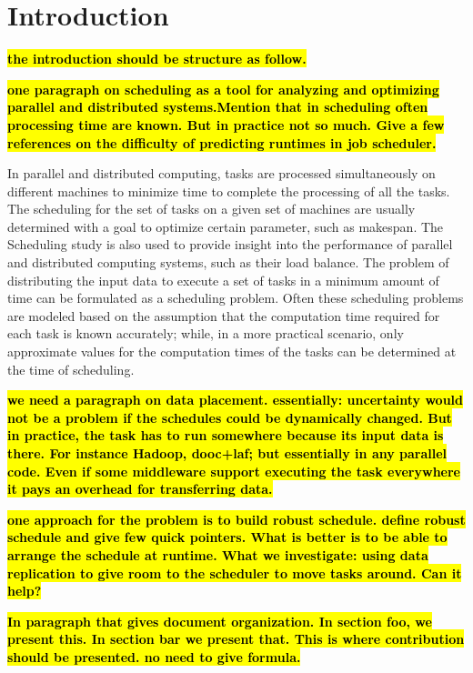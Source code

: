 \documentclass[10pt, conference, compsocconf]{IEEEtran}
\newcommand{\todo}[1]{{\color{red}\textbf{\hl{#1}}\xspace}}
\begin{document}
\IEEEpeerreviewmaketitle

\section{Introduction}

\todo{the introduction should be structure as follow.}

\todo{one paragraph on scheduling as a tool for analyzing and
  optimizing parallel and distributed systems.Mention that in
  scheduling often processing time are known. But in practice not so
  much. Give a few references on the difficulty of predicting runtimes
  in job scheduler.}
  
  In parallel and distributed computing, tasks are processed simultaneously on different machines to minimize time to complete the processing of all the tasks.   The scheduling for the set of tasks on a given set of machines are usually determined with a goal to optimize certain parameter, such as makespan.  The Scheduling study is also used to provide insight into the performance of parallel and distributed computing systems, such as their load balance.  The problem of distributing the input data to execute a set of tasks in a minimum amount of time can be formulated as a scheduling problem.  Often these scheduling problems are modeled based on the assumption that the computation time required for each task is known accurately; while, in a more practical scenario, only approximate values for the computation times of the tasks can be determined at the time of scheduling.

\todo{we need a paragraph on data placement. essentially: uncertainty
  would not be a problem if the schedules could be dynamically
  changed. But in practice, the task has to run somewhere because its
  input data is there. For instance Hadoop, dooc+laf; but essentially
  in any parallel code. Even if some middleware support executing the
  task everywhere it pays an overhead for transferring data.}

\todo{one approach for the problem is to build robust schedule. define
  robust schedule and give few quick pointers. What is better is to be
  able to arrange the schedule at runtime. What we investigate: using
  data replication to give room to the scheduler to move tasks
  around. Can it help?}

\todo{In paragraph that gives document organization. In section foo,
  we present this. In section bar we present that. This is where
  contribution should be presented. no need to give formula.}
\end{document}
